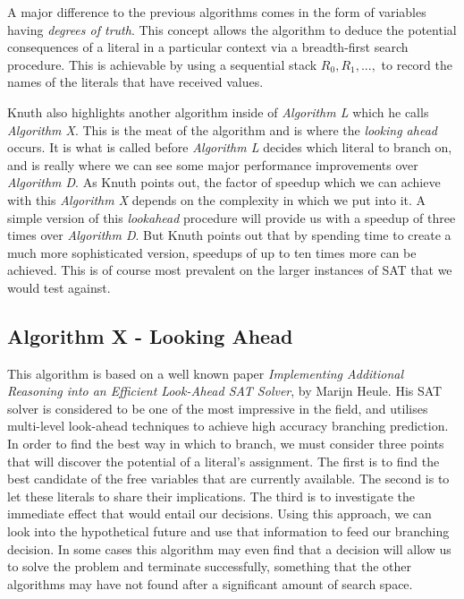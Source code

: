 \documentclass{article}
\begin{document}
A major difference to the previous algorithms comes in the form of variables having \textit{degrees of truth}. This concept allows
the algorithm to deduce the potential consequences of a literal in a particular context via a breadth-first search procedure. This
is achievable by using a sequential stack $R_0, R_1, ...,$ to record the names of the literals that have received values.

Knuth also highlights another algorithm inside of \textit{Algorithm L} which he calls \textit{Algorithm X}. This is the meat of
the algorithm and is where the \textit{looking ahead} occurs. It is what is called before \textit{Algorithm L} decides which
literal to branch on, and is really where we can see some major performance improvements over \textit{Algorithm D}. As Knuth
points out, the factor of speedup which we can achieve with this \textit{Algorithm X} depends on the complexity in which we put
into it. A simple version of this \textit{lookahead} procedure will provide us with a speedup of three times over
\textit{Algorithm D}. But Knuth points out that by spending time to create a much more sophisticated version, speedups of up to
ten times more can be achieved. This is of course most prevalent on the larger instances of SAT that we would test against. 

\subsection{Algorithm X - Looking Ahead}
This algorithm is based on a well known paper \textit{Implementing Additional Reasoning into an Efficient Look-Ahead SAT Solver},
by Marijn Heule\cite{march}. His SAT solver is considered to be one of the most impressive in the field, and utilises multi-level
look-ahead techniques to achieve high accuracy branching prediction. In order to find the best way in which to branch, we must
consider three points that will discover the potential of a literal's assignment. The first is to find the best candidate of the
free variables that are currently available. The second is to let these literals to share their implications. The third is to
investigate the immediate effect that would entail our decisions. Using this approach, we can look into the hypothetical future
and use that information to feed our branching decision. In some cases this algorithm may even find that a decision will allow us
to solve the problem and terminate successfully, something that the other algorithms may have not found after a significant amount
of search space. 
\end{document}
